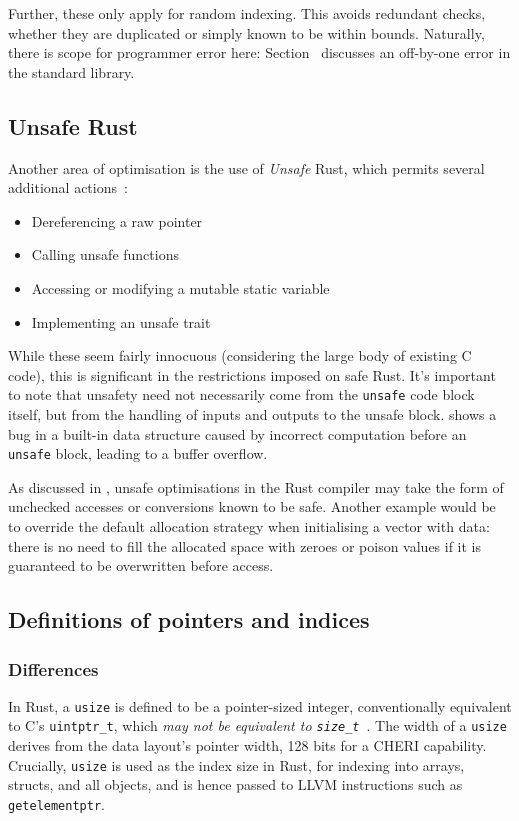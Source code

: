 \documentclass[dissertation.tex]{subfiles}
\begin{document}
Further, these only apply for random indexing.
This avoids redundant checks, whether they are duplicated or simply
known to be within bounds.
Naturally, there is scope for programmer error here:
Section~ discusses an off-by-one error in
the standard library.


\subsection{Unsafe Rust}
\label{sec:rust-unsafe}

Another area of optimisation is the use of \emph{Unsafe} Rust, which
permits several additional actions~\cite{rust-unsafe-powers}:

\begin{itemize}
    \item Dereferencing a raw pointer
    \item Calling unsafe functions
    \item Accessing or modifying a mutable static variable
    \item Implementing an unsafe trait
\end{itemize}

While these seem fairly innocuous (considering the large body of
existing C code), this is significant in the restrictions imposed on
safe Rust.
It's important to note that unsafety need not necessarily come from
the \texttt{unsafe} code block itself, but from the handling of inputs
and outputs to the unsafe block.
 shows a bug in a built-in data structure
caused by incorrect computation before an \texttt{unsafe} block, leading
to a buffer overflow.

As discussed in , unsafe optimisations in
the Rust compiler may take the form of unchecked accesses or conversions
known to be safe.
Another example would be to override the default allocation strategy
when initialising a vector with data: there is no need to fill the
allocated space with zeroes or poison values if it is guaranteed to be
overwritten before access.


\subsection{Definitions of pointers and indices}
\label{sec:rust-usize}

\subsubsection{Differences}
In Rust, a \texttt{usize} is defined to be a pointer-sized integer,
conventionally equivalent to C's \texttt{uintptr\_t}, which \emph{may
not be equivalent to \texttt{size\_t}}~\cite{rust-rfc-isize}.
The width of a \texttt{usize} derives from the data layout's pointer
width, 128 bits for a CHERI capability.
Crucially, \texttt{usize} is used as the index size in Rust, for
indexing into arrays, structs, and all objects, and is hence passed to
LLVM instructions such as \texttt{getelementptr}.
\end{document}
